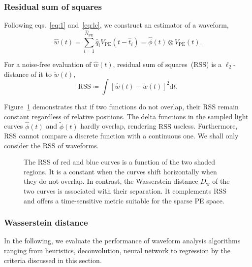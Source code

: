 \subsubsection{Residual sum of squares}
\label{sec:rss}

Following eqs.~\eqref{eq:1} and~\eqref{eq:lc}, we construct an estimator of a waveform,
\begin{equation}
  \label{eq:w-hat}
  \hat{w}(t) = \sum_{i=1}^{\hat{N}_\mathrm{PE}}\hat{q}_i V_\mathrm{PE}(t-\hat{t}_i) = \hat{\phi}(t) \otimes V_\mathrm{PE}(t).
\end{equation}

For a noise-free evaluation of $\hat{w}(t)$, residual sum of squares~(RSS) is a $\ell_2$-distance of it to $\tilde{w}(t)$,
\begin{equation}
  \label{eq:rss}
  \mathrm{RSS} \coloneqq\int\left[\hat{w}(t) - \tilde{w}(t)\right]^2\mathrm{d}t.
\end{equation}

Figure~\ref{fig:l2} demonstrates that if two functions do not overlap, their $\mathrm{RSS}$ remain constant regardless of relative positions.  The delta functions in the sampled light curves $\hat{\phi}(t)$ and $\tilde{\phi}(t)$ hardly overlap, rendering $\mathrm{RSS}$ useless.  Furthermore, RSS cannot compare a discrete function with a continuous one.  We shall only consider the $\mathrm{RSS}$ of waveforms.

\begin{figure}[H]
  \centering
  \resizebox{0.6\textwidth}{!}{}
  \caption{\label{fig:l2} The $\mathrm{RSS}$ of red and blue curves is a function of the two shaded regions. It is a constant when the curves shift horizontally when they do not overlap.  In contrast, the Wasserstein distance $D_\mathrm{w}$ of the two curves is associated with their separation.  It complements $\mathrm{RSS}$ and offers a time-sensitive metric suitable for the sparse PE space.}
\end{figure}

\subsubsection{Wasserstein distance}
\label{sec:W-dist}



In the following, we  evaluate the performance of waveform analysis algorithms ranging from heuristics, deconvolution, neural network to regression by the criteria discussed in this section.

